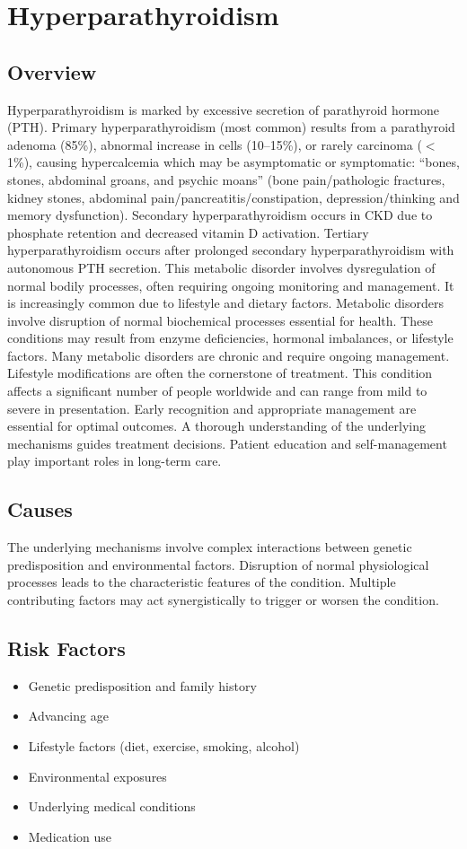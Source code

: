 \chapter{Hyperparathyroidism}
\label{sec:Hyperparathyroidism}

\section{Overview}
Hyperparathyroidism is marked by excessive secretion of parathyroid hormone (PTH). Primary hyperparathyroidism (most common) results from a parathyroid adenoma (85\%), abnormal increase in cells (10--15\%), or rarely carcinoma ($<$1\%), causing hypercalcemia which may be asymptomatic or symptomatic: ``bones, stones, abdominal groans, and psychic moans'' (bone pain/pathologic fractures, kidney stones, abdominal pain/pancreatitis/constipation, depression/thinking and memory dysfunction). Secondary hyperparathyroidism occurs in CKD due to phosphate retention and decreased vitamin D activation. Tertiary hyperparathyroidism occurs after prolonged secondary hyperparathyroidism with autonomous PTH secretion. This metabolic disorder involves dysregulation of normal bodily processes, often requiring ongoing monitoring and management. It is increasingly common due to lifestyle and dietary factors. Metabolic disorders involve disruption of normal biochemical processes essential for health. These conditions may result from enzyme deficiencies, hormonal imbalances, or lifestyle factors. Many metabolic disorders are chronic and require ongoing management. Lifestyle modifications are often the cornerstone of treatment. This condition affects a significant number of people worldwide and can range from mild to severe in presentation. Early recognition and appropriate management are essential for optimal outcomes. A thorough understanding of the underlying mechanisms guides treatment decisions. Patient education and self-management play important roles in long-term care.
\section{Causes}
The underlying mechanisms involve complex interactions between genetic predisposition and environmental factors. Disruption of normal physiological processes leads to the characteristic features of the condition. Multiple contributing factors may act synergistically to trigger or worsen the condition.
\section{Risk Factors}
\begin{itemize}[noitemsep]
  \item Genetic predisposition and family history
  \item Advancing age
  \item Lifestyle factors (diet, exercise, smoking, alcohol)
  \item Environmental exposures
  \item Underlying medical conditions
  \item Medication use
\end{itemize}
